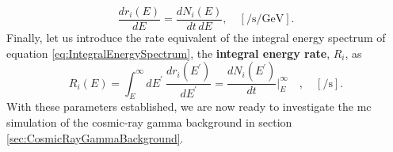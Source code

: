 \begin{equation} \label{eq:DifferentialEnergyRate}
    \frac{dr_i(E)}{dE} = \frac{dN_i(E)}{dt\,dE}, \quad \left[ \si{\per\second\per\giga\electronvolt} \right].
\end{equation}
Finally, let us introduce the rate equivalent of the integral energy spectrum of equation \ref{eq:IntegralEnergySpectrum}, the \textbf{integral energy rate}, $R_i$, as
\begin{equation} \label{eq:IntegralEnergyRate}
    R_i(E) = \int_{E}^{\infty} dE^{\prime} \ \frac{dr_i(E^{\prime})}{dE^{\prime}} = \frac{dN_i(E^{\prime})}{dt}\Biggr|_{E}^{\infty}\quad , \quad \left[ \si{\per\second} \right].
\end{equation}
With these parameters established, we are now ready to investigate the \gls{mc} simulation of the cosmic-ray gamma background in section \ref{sec:CosmicRayGammaBackground}.

